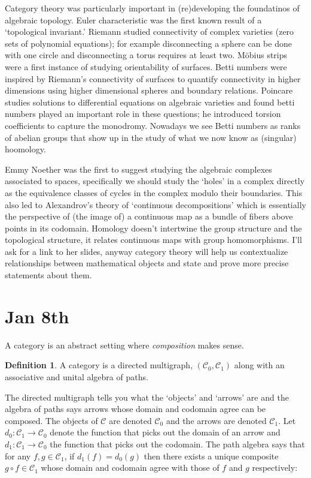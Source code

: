 \documentclass[11pt]{amsart}
\theoremstyle{plain}
\theoremstyle{definition}
\newtheorem{defn}[thm]{Definition}
\newcommand{\cC}{{\mathcal C}}
\newcommand{\noi}{{\noindent}}
\begin{document}
Category theory was particularly important in (re)developing the foundatinos of algebraic topology. Euler characteristic was the first known result of a `topological invariant.' Riemann studied connectivity of complex varieties (zero sets of polynomial equations); for example disconnecting a sphere can be done with one circle and disconnecting a torus requires at least two. M\"obius strips were a first instance of studying orientability of surfaces. Betti numbers were inspired by Riemann's connectivity of surfaces to quantify connectivity in higher dimensions using higher dimensional spheres and boundary relations. Poincare studies solutions to differential equations on algebraic varieties and found betti numbers played an important role in these questions; he introduced torsion coefficients to capture the monodromy. Nowadays we see Betti numbers as ranks of abelian groups that show up in the study of what we now know as (singular) hoomology.\par

Emmy Noether was the first to suggest studying the algebraic complexes associated to spaces, specifically we should study the `holes' in a complex directly as the equivalence classes of cycles in the complex modulo their boundaries. This also led to Alexandrov's theory of `continuous decompositions' which is essentially the perspective of (the image of) a continuous map as a bundle of fibers above points in its codomain. Homology doesn't intertwine the group structure and the topological structure, it relates continuous maps with group homomorphisms. I'll ask for a link to her slides, anyway category theory will help us contextualize relationships between mathematical objects and state and prove more precise statements about them. 


\section{Jan 8th}

A category is an abstract setting where \textit{composition} makes sense. 

\begin{defn}
A category is a directed multigraph, $(\cC_0, \cC_1)$ along with an associative and unital algebra of paths. 
\end{defn}

\noi The directed multigraph tells you what the `objects' and `arrows' are and the algebra of paths says arrows whose domain and codomain agree can be composed. The objects of $\cC$ are denoted $\cC_0$ and the arrows are denoted $\cC_1$. Let $d_0 : \cC_1 \to \cC_0$ denote the function that picks out the domain of an arrow and $d_1 : \cC_1 \to \cC_0$ the function that picks out the codomain. The path algebra says that for any $f, g \in \cC_1$, if $d_1(f) = d_0(g)$ then there exists a unique composite $g \circ f \in \cC_1$ whose domain and codomain agree with those of $f$ and $g$ respectively:
\end{document}

